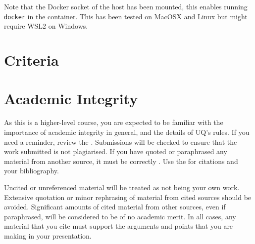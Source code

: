 \documentclass{csse4400}
\begin{document}
\noindent
Note that the Docker socket of the host has been mounted,
this enables running \texttt{docker} in the container.
This has been tested on MacOSX and Linux but might require WSL2 on Windows.

\section{Criteria}

\section{Academic Integrity}
As this is a higher-level course, you are expected to be familiar with the importance of academic integrity in general, and the details of UQ's rules.
If you need a reminder, review the .
Submissions will be checked to ensure that the work submitted is not plagiarised.
If you have quoted or paraphrased any material from another source, it must be correctly .
Use the  for citations and your bibliography.

Uncited or unreferenced material will be treated as not being your own work.
Extensive quotation or minor rephrasing of material from cited sources should be avoided.
Significant amounts of cited material from other sources, even if paraphrased, will be considered to be of no academic merit.
In all cases, any material that you cite must support the arguments and points that you are making in your presentation.



\end{document}
